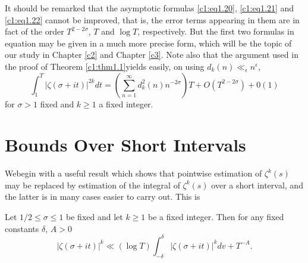 It should be remarked that the asymptotic formulas \eqref{c1:eq1.20},
\eqref{c1:eq1.21} and \eqref{c1:eq1.22} cannot be improved, that is,
the error terms appearing in them are in fact of the order $T^{2- 2
  \sigma}$, $T$ and $\log T$, respectively. But the first two formulas
in equation may be given in a much more precise form, which will be
the topic of our study in Chapter \ref{c2} and Chapter \ref{c3}. Note also that the
argument used in the proof of Theorem \ref{c1:thm1.1}yields easily, on using $d_k
(n) \ll_\epsilon n^\epsilon$,
$$
\int^T_1 |\zeta (\sigma + it )|^{2k}dt = \left(\sum^\infty_{n=1}
d^2_k (n) n^{-2 \sigma}\right) T + O (T^{2-2 \sigma})+ 0 (1) 
$$
for $\sigma > 1$ fixed and $k \geq 1$ a fixed integer.

\section{Bounds Over Short Intervals}\label{c1:s3}

We\pageoriginale begin with a useful result which shows that pointwise estimation of
$\zeta^k(s)$ may be replaced by estimation of the integral of $\zeta^k
(s)$ over a short interval, and the latter is in many cases easier to
carry out. This is 

\begin{thm}\label{c1:thm1.2}
  Let $1/2 \leq \sigma \leq 1$ be fixed and let $k\geq 1$ be a fixed
  integer. Then for any fixed constants $\delta$, $A > 0$
  \begin{equation}
    |\zeta (\sigma + it )|^k \ll (\log T) \int^\delta_{- \delta}
    |\zeta (\sigma + it )|^k dv + T^{-A}.\label{c1:eq1.23}
  \end{equation}
\end{thm}

